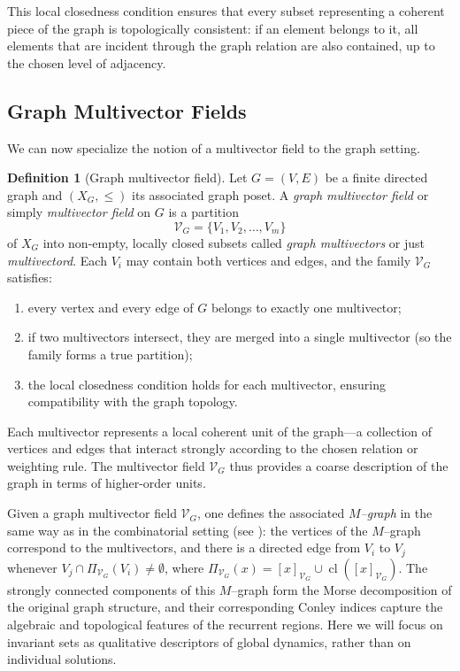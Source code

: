 \documentclass{article}
\theoremstyle{definition}
\newtheorem{definition}{Definition}
\theoremstyle{plain}
\theoremstyle{remark}
\newcommand{\1}{\mathbbm{1}}  %
\begin{document}
This local closedness condition ensures that every subset representing a
coherent piece of the graph is topologically consistent: if an element
belongs to it, all elements that are incident through the graph relation
are also contained, up to the chosen level of adjacency.

\subsection{Graph Multivector Fields}

We can now specialize the notion of a multivector field to the graph
setting.

\begin{definition}[Graph multivector field]
Let $G=(V,E)$ be a finite directed graph and $(X_G,\leq)$ its associated
graph poset.  A \emph{graph multivector field} or simply \emph{multivector field} on $G$ is a partition
\[
\mathcal{V}_G = \{V_1, V_2, \dots, V_m\}
\]
of $X_G$ into non-empty, locally closed subsets called
\emph{graph multivectors} or just \emph{multivectord}.  Each $V_i$ may contain both vertices and
edges, and the family $\mathcal{V}_G$ satisfies:
\begin{enumerate}
    \item[(i)] every vertex and every edge of $G$ belongs to exactly one
    multivector;
    \item[(ii)] if two multivectors intersect, they are merged into a
    single multivector (so the family forms a true partition);
    \item[(iii)] the local closedness condition holds for each
    multivector, ensuring compatibility with the graph topology.
\end{enumerate}
\end{definition}

Each multivector represents a local coherent unit of the graph---a
collection of vertices and edges that interact strongly according to the
chosen relation or weighting rule.  The multivector field
$\mathcal{V}_G$ thus provides a coarse description of the graph in terms
of higher-order units.

Given a graph multivector field $\mathcal{V}_G$, one defines the
associated \emph{$M$--graph} in the same way as in the combinatorial
setting (see \cite{lipinski2019conley}): the vertices of the $M$--graph correspond to the multivectors,
and there is a directed edge from $V_i$ to $V_j$ whenever
$V_j \cap \Pi_{\mathcal{V}_G}(V_i) \neq \emptyset$, where
$\Pi_{\mathcal{V}_G}(x) = [x]_{\mathcal{V}_G} \cup
\operatorname{cl}([x]_{\mathcal{V}_G})$.  The strongly connected
components of this $M$--graph form the Morse decomposition of the
original graph structure, and their corresponding Conley indices capture
the algebraic and topological features of the recurrent regions. Here we will focus on invariant sets as qualitative descriptors of global dynamics, rather
than on individual solutions.
\medskip
\end{document}
